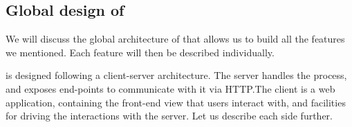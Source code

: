 \subsection{Global design of \PeaCoq{}}

We will discuss the global architecture of \PeaCoq{} that allows us to build all
the features we mentioned.  Each feature will then be described individually.

\PeaCoq{} is designed following a client-server architecture.  The server
handles the \Coq{} process, and exposes end-points to communicate with it via
HTTP.\@ The client is a web application, containing the front-end view that users
interact with, and facilities for driving the interactions with the server.  Let
us describe each side further.

\tikzset{>=latex}

